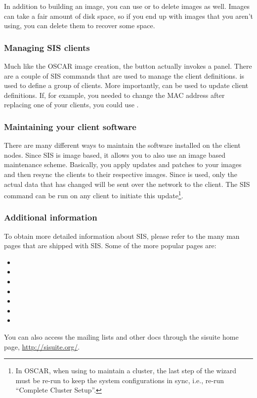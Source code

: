 In addition to building an image, you can use  or 
to delete images as well. Images can take a fair amount of disk space, so if
you end up with images that you aren't using, you can delete them to recover 
some space.

\subsubsection{Managing SIS clients}

Much like the OSCAR image creation, the 
button actually invokes a  panel. There are a couple of SIS
commands that are used to manage the client definitions.
 is used to define a group of clients. More
importantly,  can be used to update client
definitions. If, for example, you needed to change the MAC address
after replacing one of your clients, you could use .

\subsubsection{Maintaining your client software}

There are many different ways to maintain the software installed on the client
nodes. Since SIS is image based, it allows you to also use an image based 
maintenance scheme. Basically, you apply updates and patches to your images 
and then resync the clients to their respective images. Since  is
used, only the actual data that has changed will be sent over the network to 
the client. The SIS command  can be run on any client to
initiate this update\footnote{In OSCAR, when using  to
maintain a cluster, the last step of the wizard must be re-run to keep the
system configurations in sync, i.e., re-run ``Complete Cluster Setup''.}.

\subsubsection{Additional information}

To obtain more detailed information about SIS, please refer to the many man
pages that are shipped with SIS. Some of the more popular pages are:

\begin{itemize}
\item {}
\item {}
\item {}
\item {}
\item {}
\item {}
\item {}
\end{itemize}

You can also access the mailing lists and other docs through the sisuite
home page, \url{http://sisuite.org/}.
